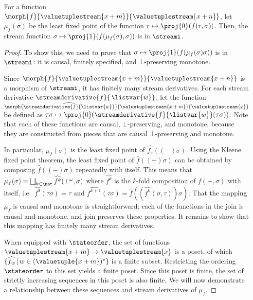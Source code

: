 \documentclass{lmcs}
\begin{document}
\begin{thm}\label{thm:trace-well-defined}
    For a function \(\morph{f}{\valuetuplestream{x+m}}{\valuetuplestream{x+n}}\),
    let \(\mu_f(\sigma)\) be the least fixed point of the function \(
    \tau \mapsto \proj{0}\mleft(f(\tau,\sigma)\mright)
    \).
    Then, the stream function \(
    \sigma \mapsto \proj{1}\mleft(f(\mu_f(\sigma), \sigma)\mright)
    \) is in \(\streami\).
\end{thm}
\begin{proof}
    To show this, we need to prove that
    \(\sigma \mapsto \proj{1}\mleft(f(\mu_f(\sigma)\sigma)\mright)\) is in
    \(\streami\): it is causal, finitely specified, and \(\bot\)-preserving
    monotone.

    Since \(
    \morph{f}{\valuetuplestream{x+m}}{\valuetuplestream{x+n}}
    \) is a morphism of \(\streami\), it has finitely many stream derivatives.
    For each stream derivative \(\streamderivative{f}{\,\listvar{w}}\), let the
    function \(
    \morph{
        \widehat{\streamderivative{f}{\listvar{w}}}
    }{
        \valuetuplestream{x+m}
    }{
        \valuetuplestream{x}
    }
    \) be defined as \(
    \tau\sigma
    \mapsto
    \proj{0}(\streamderivative{f}{\listvar{w}}(\tau\sigma))
    \).
    Note that each of these functions are causal, \(\bot\)-preserving, and
    monotone, because they are constructed from pieces that are causal
    \(\bot\)-preserving and monotone.

    In particular, \(\mu_f(\sigma)\) is the least fixed point of
    \(\widehat{f_\varepsilon}\left((-)\sigma\right)\).
    Using the Kleene fixed point theorem, the least fixed point of
    \(\widehat{f}((-)\sigma)\) can be obtained by composing
    \(\widehat{f}((-)\sigma)\) repeatedly with itself.
    This means that \(
    \mu_f(\sigma)
    =
    \bigsqcup_{k \in \nat} \widehat{f^k}(\bot^\omega,\sigma)
    \) where \(\widehat{f^k}\) is the \(k\)-fold composition of \(f(-,\sigma)\)
    with itself, i.e.\ \(\widehat{f^0}(\tau\sigma) = \tau\) and \(
    \widehat{f^{k+1}}(\tau\sigma)
    =
    \widehat{f}\left(\left(\widehat{f^{k}}(\sigma, \tau)\right)\sigma\right)
    \).
    That the mapping \(\mu_f\) is causal and monotone is
    straightforward: each of the functions in the join is causal and monotone,
    and join preserves these properties.
    It remains to show that this mapping has finitely many stream derivatives.

    When equipped with \(\stateorder\), the set of functions
    \(\valuetuplestream{x+m} \to \valuetuplestream{x}\)
    is a poset, of which
    \(\{\widehat{f_w} \,|\, w \in (\valuetuple{x+m})^\star\}\)
    is a finite subset.
    Restricting the ordering \(\stateorder\) to this set yields a finite poset.
    Since this poset is finite, the set of strictly increasing sequences in this
    poset is also finite.
    We will now demonstrate a relationship between these sequences and stream
    derivatives of \(\mu_f\).


\end{proof}
\end{document}
